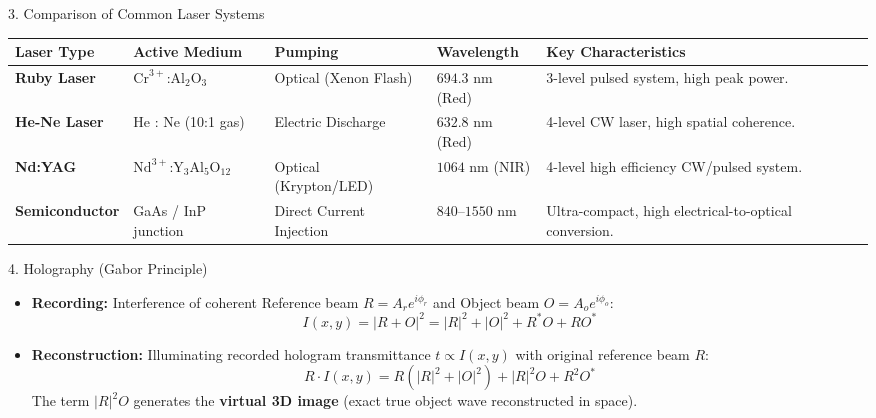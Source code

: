 \begin{formulabox}{3. Comparison of Common Laser Systems}
\begin{tabularx}{\textwidth}{l l l l X}
\toprule
\textbf{Laser Type} & \textbf{Active Medium} & \textbf{Pumping} & \textbf{Wavelength} & \textbf{Key Characteristics} \\
\midrule
\textbf{Ruby Laser} & $\text{Cr}^{3+}\text{:Al}_2\text{O}_3$ & Optical (Xenon Flash) & $694.3\text{ nm}$ (Red) & 3-level pulsed system, high peak power. \\
\textbf{He-Ne Laser} & He : Ne (10:1 gas) & Electric Discharge & $632.8\text{ nm}$ (Red) & 4-level CW laser, high spatial coherence. \\
\textbf{Nd:YAG} & $\text{Nd}^{3+}\text{:Y}_3\text{Al}_5\text{O}_{12}$ & Optical (Krypton/LED) & $1064\text{ nm}$ (NIR) & 4-level high efficiency CW/pulsed system. \\
\textbf{Semiconductor} & GaAs / InP junction & Direct Current Injection & $840\text{--}1550\text{ nm}$ & Ultra-compact, high electrical-to-optical conversion. \\
\bottomrule
\end{tabularx}
\end{formulabox}

\begin{formulabox}{4. Holography (Gabor Principle)}
\begin{itemize}[leftmargin=*,itemsep=2pt]
    \item \textbf{Recording:} Interference of coherent Reference beam $R = A_r e^{i\phi_r}$ and Object beam $O = A_o e^{i\phi_o}$:
    \[
    I(x,y) = |R + O|^2 = |R|^2 + |O|^2 + R^* O + R O^*
    \]
    \item \textbf{Reconstruction:} Illuminating recorded hologram transmittance $t \propto I(x,y)$ with original reference beam $R$:
    \[
    R \cdot I(x,y) = R(|R|^2 + |O|^2) + |R|^2 O + R^2 O^*
    \]
    The term $|R|^2 O$ generates the \textbf{virtual 3D image} (exact true object wave reconstructed in space).
\end{itemize}
\end{formulabox}
